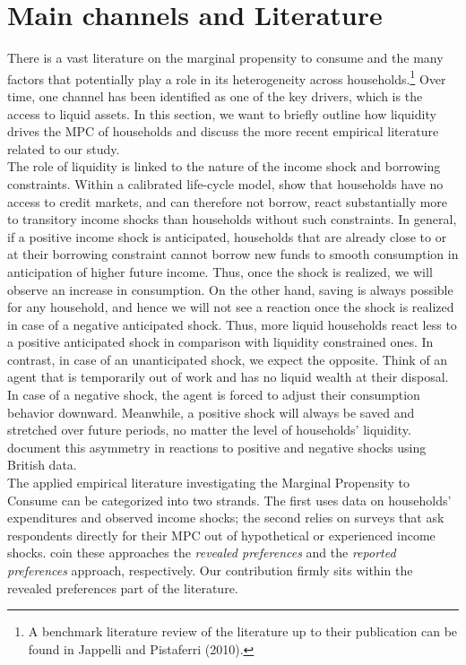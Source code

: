 \section{Main channels and Literature} \label{sec:lit}
There is a vast literature on the marginal propensity to consume and the many factors that potentially play a role in its heterogeneity across households.\footnote{A benchmark literature review of the literature up to their publication can be found in Jappelli and Pistaferri (2010).} Over time, one channel has been identified as one of the key drivers, which is the access to liquid assets. In this section, we want to briefly outline how liquidity drives the MPC of households and discuss the more recent empirical literature related to our study. \\ 
The role of liquidity is linked to the nature of the income shock and borrowing constraints. Within a calibrated life-cycle model, \cite{kalpanviolante_2010} show that households have no access to credit markets, and can therefore not borrow, react substantially more to transitory income shocks than households without such constraints. In general, if a positive income shock is anticipated, households that are already close to or at their borrowing constraint cannot borrow new funds to smooth consumption in anticipation of higher future income. Thus, once the shock is realized, we will observe an increase in consumption. On the other hand, saving is always possible for any household, and hence we will not see a reaction once the shock is realized in case of a negative anticipated shock. Thus, more liquid households react less to a positive anticipated shock in comparison with liquidity constrained ones. In contrast, in case of an unanticipated shock, we expect the opposite. Think of an agent that is temporarily out of work and has no liquid wealth at their disposal. In case of a negative shock, the agent is forced to adjust their consumption behavior downward. Meanwhile, a positive shock will always be saved and stretched over future periods, no matter the level of households' liquidity. \cite{bunnetal_2018} document this asymmetry in reactions to positive and negative shocks using British data.\\
The applied empirical literature investigating the Marginal Propensity to Consume can be categorized into two strands. The first uses data on households' expenditures and observed income shocks; the second relies on surveys that ask respondents directly for their MPC out of hypothetical or experienced income shocks. \cite{parkersouleles_2019} coin these approaches the \textit{revealed preferences} and the \textit{reported preferences} approach, respectively. Our contribution firmly sits within the revealed preferences part of the literature. \\
